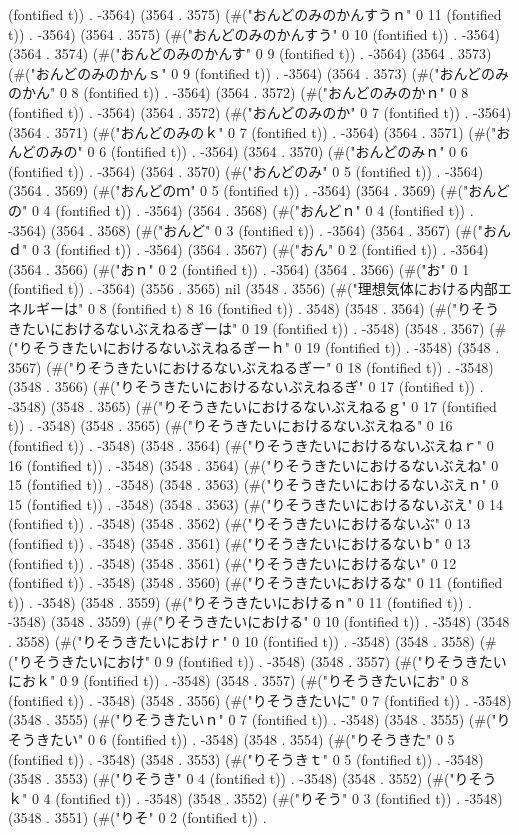 (fontified t)) . -3564) (3564 . 3575) (#("おんどのみのかんすうｎ" 0 11 (fontified t)) . -3564) (3564 . 3575) (#("おんどのみのかんすう" 0 10 (fontified t)) . -3564) (3564 . 3574) (#("おんどのみのかんす" 0 9 (fontified t)) . -3564) (3564 . 3573) (#("おんどのみのかんｓ" 0 9 (fontified t)) . -3564) (3564 . 3573) (#("おんどのみのかん" 0 8 (fontified t)) . -3564) (3564 . 3572) (#("おんどのみのかｎ" 0 8 (fontified t)) . -3564) (3564 . 3572) (#("おんどのみのか" 0 7 (fontified t)) . -3564) (3564 . 3571) (#("おんどのみのｋ" 0 7 (fontified t)) . -3564) (3564 . 3571) (#("おんどのみの" 0 6 (fontified t)) . -3564) (3564 . 3570) (#("おんどのみｎ" 0 6 (fontified t)) . -3564) (3564 . 3570) (#("おんどのみ" 0 5 (fontified t)) . -3564) (3564 . 3569) (#("おんどのｍ" 0 5 (fontified t)) . -3564) (3564 . 3569) (#("おんどの" 0 4 (fontified t)) . -3564) (3564 . 3568) (#("おんどｎ" 0 4 (fontified t)) . -3564) (3564 . 3568) (#("おんど" 0 3 (fontified t)) . -3564) (3564 . 3567) (#("おんｄ" 0 3 (fontified t)) . -3564) (3564 . 3567) (#("おん" 0 2 (fontified t)) . -3564) (3564 . 3566) (#("おｎ" 0 2 (fontified t)) . -3564) (3564 . 3566) (#("お" 0 1 (fontified t)) . -3564) (3556 . 3565) nil (3548 . 3556) (#("理想気体における内部エネルギーは" 0 8 (fontified t) 8 16 (fontified t)) . 3548) (3548 . 3564) (#("りそうきたいにおけるないぶえねるぎーは" 0 19 (fontified t)) . -3548) (3548 . 3567) (#("りそうきたいにおけるないぶえねるぎーｈ" 0 19 (fontified t)) . -3548) (3548 . 3567) (#("りそうきたいにおけるないぶえねるぎー" 0 18 (fontified t)) . -3548) (3548 . 3566) (#("りそうきたいにおけるないぶえねるぎ" 0 17 (fontified t)) . -3548) (3548 . 3565) (#("りそうきたいにおけるないぶえねるｇ" 0 17 (fontified t)) . -3548) (3548 . 3565) (#("りそうきたいにおけるないぶえねる" 0 16 (fontified t)) . -3548) (3548 . 3564) (#("りそうきたいにおけるないぶえねｒ" 0 16 (fontified t)) . -3548) (3548 . 3564) (#("りそうきたいにおけるないぶえね" 0 15 (fontified t)) . -3548) (3548 . 3563) (#("りそうきたいにおけるないぶえｎ" 0 15 (fontified t)) . -3548) (3548 . 3563) (#("りそうきたいにおけるないぶえ" 0 14 (fontified t)) . -3548) (3548 . 3562) (#("りそうきたいにおけるないぶ" 0 13 (fontified t)) . -3548) (3548 . 3561) (#("りそうきたいにおけるないｂ" 0 13 (fontified t)) . -3548) (3548 . 3561) (#("りそうきたいにおけるない" 0 12 (fontified t)) . -3548) (3548 . 3560) (#("りそうきたいにおけるな" 0 11 (fontified t)) . -3548) (3548 . 3559) (#("りそうきたいにおけるｎ" 0 11 (fontified t)) . -3548) (3548 . 3559) (#("りそうきたいにおける" 0 10 (fontified t)) . -3548) (3548 . 3558) (#("りそうきたいにおけｒ" 0 10 (fontified t)) . -3548) (3548 . 3558) (#("りそうきたいにおけ" 0 9 (fontified t)) . -3548) (3548 . 3557) (#("りそうきたいにおｋ" 0 9 (fontified t)) . -3548) (3548 . 3557) (#("りそうきたいにお" 0 8 (fontified t)) . -3548) (3548 . 3556) (#("りそうきたいに" 0 7 (fontified t)) . -3548) (3548 . 3555) (#("りそうきたいｎ" 0 7 (fontified t)) . -3548) (3548 . 3555) (#("りそうきたい" 0 6 (fontified t)) . -3548) (3548 . 3554) (#("りそうきた" 0 5 (fontified t)) . -3548) (3548 . 3553) (#("りそうきｔ" 0 5 (fontified t)) . -3548) (3548 . 3553) (#("りそうき" 0 4 (fontified t)) . -3548) (3548 . 3552) (#("りそうｋ" 0 4 (fontified t)) . -3548) (3548 . 3552) (#("りそう" 0 3 (fontified t)) . -3548) (3548 . 3551) (#("りそ" 0 2 (fontified t)) . 